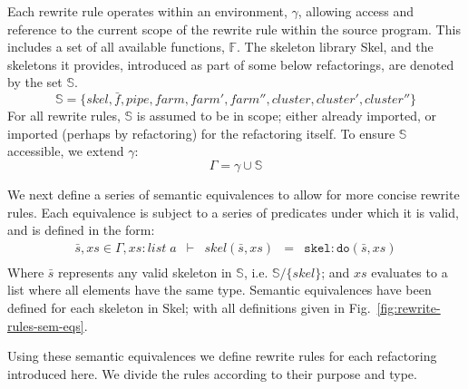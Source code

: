 \documentclass{article}
\makeatletter
\newcommand{\s}[0]{\bar{s}}
\newcommand{\type}[3]{#1: #2\; #3}
\newcommand{\ing}[1]{#1 \in{} \Gamma}
\newcommand{\seq}[3]{#1 & \vdash{} & #2 & = & #3}
\newcommand{\skel}[0]{Skel}
\newcommand{\ie}[0]{i.e.\@\xspace}
\makeatother
\begin{document}
Each rewrite rule operates within an environment, $\gamma$, allowing access and
reference to the current scope of the rewrite rule within the source program.
This includes a set of all available functions, $\mathbb{F}$. The skeleton
library \skel, and the skeletons it provides, introduced as part of some below
refactorings, are denoted by the set $\mathbb{S}$.
% 
\[
  \mathbb{S} = \{skel, \bar{f}, pipe, farm, farm', farm'', cluster, cluster',
  cluster''\} 
\]
% 
\noindent
For all rewrite rules, $\mathbb{S}$ is assumed to be in scope; either already
imported, or imported (perhaps by refactoring) for the refactoring itself. To
ensure $\mathbb{S}$ accessible, we extend $\gamma$:
% 
\[
  \Gamma = \gamma \cup \mathbb{S}
\]
% 
\noindent

We next define a series of semantic equivalences to allow for more concise
rewrite rules. Each equivalence is subject to a series of predicates under which
it is valid, and is defined in the form:
% 
\[
  \begin{array}{rclcl}
    \seq{\ing{\s, xs}, \type{xs}{list}{a}}
    {skel(\s, xs)}{\mathtt{skel:do}(\s, xs)} \\
  \end{array}
\]
% 
\noindent
Where $\bar{s}$ represents any valid skeleton in $\mathbb{S}$, \ie{}
$\mathbb{S}/\{skel\}$; and $xs$ evaluates to a list where all elements have the
same type. Semantic equivalences have been defined for each skeleton in \skel;
with all definitions given in Fig.~\ref{fig:rewrite-rules-sem-eqs}.

Using these semantic equivalences we define rewrite rules for each refactoring
introduced here. We divide the rules according to their purpose and type. 




\end{document}
